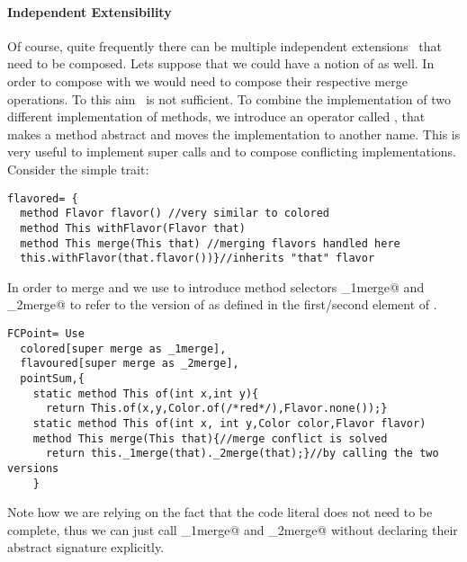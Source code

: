 \paragraph{Independent Extensibility}
  Of course, quite frequently there can be multiple independent
  extensions~\cite{Zenger-Odersky2005} that need to be composed. Lets suppose that 
  we could have a notion of \Q@flavoured@ as well.   
  In order to compose \Q@colored@ with \Q@flavored@ we would
  need to compose their respective merge operations. To this aim \use\ is not sufficient. To combine the implementation of two different implementation of methods, we introduce an operator called \Q@super@, that
 makes a method abstract and
moves the implementation to another name. This is very useful to implement super calls
 and to compose conflicting implementations.
\noindent Consider the simple \Q@flavored@ trait:
\saveSpace\saveSpace \begin{lstlisting}
flavored= {
  method Flavor flavor() //very similar to colored
  method This withFlavor(Flavor that)
  method This merge(This that) //merging flavors handled here
  this.withFlavor(that.flavor())}//inherits "that" flavor
\end{lstlisting}  \saveSpace\saveSpace

\noindent In order to merge \Q@colored@ and \Q@flavored@ we use  \Q@super@ to introduce method selectors \Q@_1merge@ and \Q@_2merge@
to refer to the version of \Q@merge@ as defined in the first/second element of \use.

\saveSpace\saveSpace \begin{lstlisting}
FCPoint= Use
  colored[super merge as _1merge],
  flavoured[super merge as _2merge],
  pointSum,{
    static method This of(int x,int y){
      return This.of(x,y,Color.of(/*red*/),Flavor.none());}
    static method This of(int x, int y,Color color,Flavor flavor)
    method This merge(This that){//merge conflict is solved 
      return this._1merge(that)._2merge(that);}//by calling the two versions
    }
\end{lstlisting}  \saveSpace\saveSpace

Note how we are relying on the fact that the code literal
 does not need to be complete, 
thus we can just call \Q@_1merge@ and \Q@_2merge@ without
 declaring their abstract signature explicitly.




